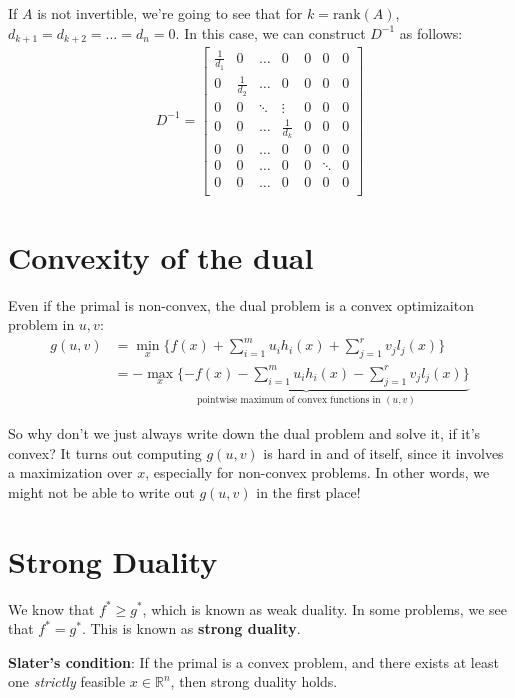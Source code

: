 \documentclass[11pt]{article}
\newcommand{\R}{\mathbb{R}}
\begin{document}
If $A$ is not invertible, we're going to see that for $k = \text{rank}(A)$,
$d_{k+1} = d_{k+2} = \dots = d_n = 0$. In this case, we can construct $D^{-1}$ as follows:
\begin{align*}
D^{-1} = \begin{bmatrix}
\frac{1}{d_1} & 0 & \dots & 0 & 0  & 0 & 0\\
0 & \frac{1}{d_2} & \dots & 0 & 0  & 0 & 0\\
0 & 0 & \ddots & \vdots & 0  & 0 & 0\\
0 & 0 & \dots & \frac{1}{d_k} & 0  & 0 & 0\\
0 & 0 & \dots & 0 & 0  & 0 & 0\\
0 & 0 & \dots & 0 & 0  & \ddots & 0\\
0 & 0 & \dots & 0 & 0  & 0 & 0\\
\end{bmatrix}
\end{align*}

\section{Convexity of the dual}

Even if the primal is non-convex, the dual problem is a convex optimizaiton
problem in $u, v$:
\begin{align*}
g(u, v) &= \min_x \{f(x) + \sum_{i=1}^m u_i h_i(x) + \sum_{j=1}^r v_j l_j(x) \} \\
        &= - \underbrace{\max_x \{-f(x) - \sum_{i=1}^m u_i h_i(x) - \sum_{j=1}^r v_j l_j(x) \}}_{\text{pointwise maximum of convex functions in } (u, v)}
\end{align*}

So why don't we just always write down the dual problem and solve it, if it's
convex? It turns out computing $g(u, v)$ is hard in and of itself, since it
involves a maximization over $x$, especially for non-convex problems. In other
words, we might not be able to write out $g(u, v)$ in the first place!

\section{Strong Duality}
We know that $f^* \geq g^*$, which is known as weak duality. In some problems, we
see that $f^* = g^*$. This is known as \textbf{strong duality}.

\textbf{Slater's condition}: If the primal is a convex problem, and there exists
at least one \textit{strictly} feasible $x \in \R^n$, then strong duality holds.
\end{document}
